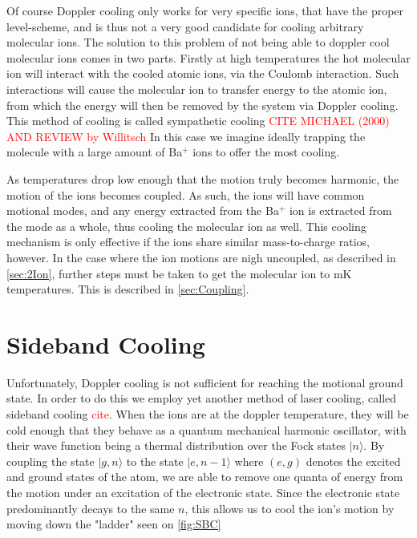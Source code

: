 Of course Doppler cooling only works for very specific ions, that have the proper level-scheme, and is thus not a very good candidate for cooling arbitrary molecular ions.
The solution to this problem of not being able to doppler cool molecular ions comes in two parts. Firstly at high temperatures the hot molecular ion will interact with the cooled atomic ions, via the Coulomb interaction. Such interactions will cause the molecular ion to transfer energy to the atomic ion, from which the energy will then be removed by the system via Doppler cooling. This method of cooling is called sympathetic cooling \textcolor{red}{CITE MICHAEL (2000) AND REVIEW by Willitsch}
In this case we imagine ideally trapping the molecule with a large amount of Ba$^+$ ions to offer the most cooling.

As temperatures drop low enough that the motion truly becomes harmonic, the motion of the ions becomes coupled. As such, the ions will have common motional modes, and any energy extracted from the Ba$^+$ ion is extracted from the mode as a whole, thus cooling the molecular ion as well.
This cooling mechanism is only effective if the ions share similar mass-to-charge ratios, however. In the case where the ion motions are nigh uncoupled, as described in \cref{sec:2Ion}, further steps must be taken to get the molecular ion to mK temperatures. This is described in \cref{sec:Coupling}.


\section{Sideband Cooling}
\label{sec:SBC}
Unfortunately, Doppler cooling is not sufficient for reaching the motional ground state. In order to do this we employ yet another method of laser cooling, called sideband cooling \textcolor{red}{cite}. When the ions are at the doppler temperature, they will be cold enough that they behave as a quantum mechanical harmonic oscillator, with their wave function
being a thermal distribution over the Fock states $\vert n \rangle$. By coupling the state $\vert g,n\rangle$ to the state $\vert e,n-1\rangle$ where $(e,g)$ denotes the excited and ground states of the atom, we are able to remove one quanta of energy from the motion under an excitation of the electronic state.
Since the electronic state predominantly decays to the same $n$, this allows us to cool the ion's motion by moving down the "ladder" seen on \cref{fig:SBC}


